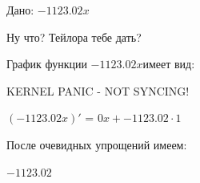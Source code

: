 \documentclass{article}
\begin{document}
\center
Дано: $-1123.02x$

\bigskip Ну что? Тейлора тебе дать?


\bigskip График функции $-1123.02x$имеет вид:

\begin{figure}[h]\label{fig:t}\end{figure}


\bigskip KERNEL PANIC - NOT SYNCING!

$(-1123.02x)'$ = $0x + -1123.02 \cdot 1$

\bigskip После очевидных упрощений имеем:

$-1123.02$
\end{document}
